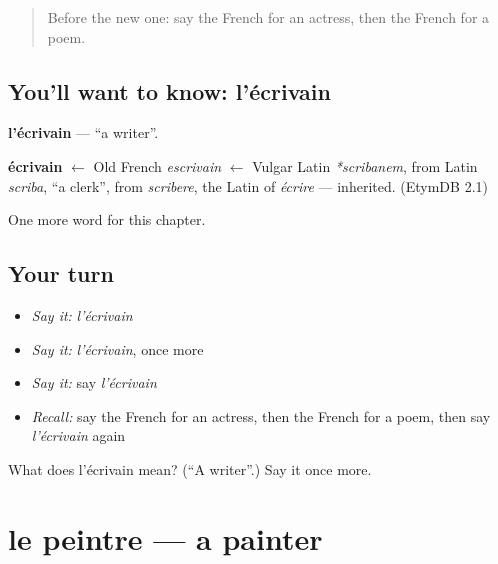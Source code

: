 \label{lesson:FR-C249-ecrivain}



\begin{quote}
Before the new one: say the French for an actress, then the French for a poem.
\end{quote}

\subsection*{You'll want to know: l'écrivain}
\textbf{l'écrivain} — \textquotedblleft{}a writer\textquotedblright{}.

\begin{cousinweb}
\textbf{écrivain} $\leftarrow$ Old French \emph{escrivain} $\leftarrow$ Vulgar Latin \emph{*scribanem}, from Latin \emph{scriba}, \textquotedblleft{}a clerk\textquotedblright{}, from \emph{scribere}, the Latin of \emph{écrire} — inherited. (EtymDB 2.1)
\end{cousinweb}

\begin{grammarlens}[title={What you've built}]
One more word for this chapter.
\end{grammarlens}

\subsection*{Your turn}
\begin{itemize}
\raggedright
  \item \emph{Say it:} \emph{l'écrivain}
  \item \emph{Say it:} \emph{l'écrivain}, once more
  \item \emph{Say it:} say \emph{l'écrivain}
  \item \emph{Recall:} say the French for an actress, then the French for a poem, then say \emph{l'écrivain} again
\end{itemize}

\begin{tcolorbox}[breakable,colback=teal!4,colframe=teal!35!black,title={Before you move on}]
What does l'écrivain mean? (\textquotedblleft{}A writer\textquotedblright{}.) Say it once more.
\end{tcolorbox}
\section[le peintre]{le peintre — a painter}

\label{lesson:FR-C249-peintre}



